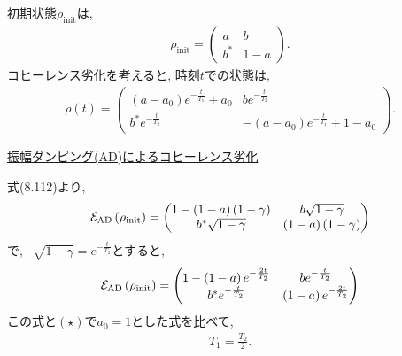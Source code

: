 \begin{ex}
    \label{ex8.30}
    初期状態$\rho_\mathrm{init}$は,
    \begin{align*}
        \rho_\mathrm{init}
        =
        \begin{pmatrix}
            a   & b     \\
            b^* & 1 - a
        \end{pmatrix}.
    \end{align*}
    コヒーレンス劣化を考えると, 時刻$t$での状態は,
    \begin{align*}
        \rho\left(t\right)
        =
        \begin{pmatrix}
            \left(a - a_0 \right) e^{ - \frac{t}{T_1}} + a_0 & b e^{-\frac{t}{T_2}}                                   \\
            b^* e^{-\frac{t}{T_2}}                           & - \left(a - a_0 \right) e^{ - \frac{t}{T_1}} + 1 - a_0
        \end{pmatrix} \tag{$\star$} .
    \end{align*}
    \par
    \underline{振幅ダンピング(AD)によるコヒーレンス劣化} \ \par
    式(8.112)より,
    \begin{align*}
        \mathcal{E}_\mathrm{AD}\left( \rho_\mathrm{init} \right)
        =
        \begin{pmatrix}
            1 - \left(1-a\right)\left(1-\gamma\right) & b \sqrt{1-\gamma}                     \\
            b^* \sqrt{1-\gamma}                       & \left(1-a\right)\left(1-\gamma\right)
        \end{pmatrix}
    \end{align*}
    で, \ $\sqrt{1-\gamma} = e^{- \frac{t}{T_2}}$とすると,
    \begin{align*}
        \mathcal{E}_\mathrm{AD}\left( \rho_\mathrm{init} \right)
        =
        \begin{pmatrix}
            1 - \left(1-a\right)e^{- \frac{2t}{T_2}} & b e^{- \frac{t}{T_2}}                \\
            b^* e^{- \frac{t}{T_2} }                 & \left(1-a\right)e^{- \frac{2t}{T_2}}
        \end{pmatrix}
    \end{align*}
    この式と$(\star)$で$a_0 = 1$とした式を比べて,
    \begin{align*}
        T_1 = \frac{T_2}{2}.
    \end{align*}


\end{ex}
